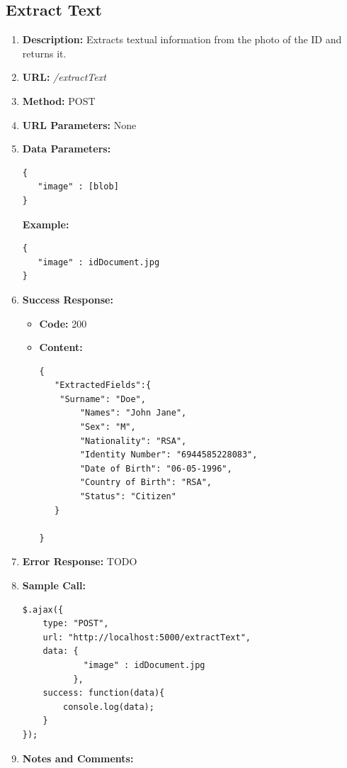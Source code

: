 \documentclass{article}
\begin{document}
\subsection{Extract Text}
\begin{enumerate}
	\item \textbf{Description:} Extracts textual information from the photo of the ID and returns it.
	\item \textbf{URL:} \textit{/extractText}
	\item \textbf{Method:} POST
	\item \textbf{URL Parameters:} None
	\item \textbf{Data Parameters:}

	\begin{lstlisting}
{
   "image" : [blob]
}
	\end{lstlisting}

	\textbf{Example:}

	\begin{lstlisting}
{
   "image" : idDocument.jpg
}
	\end{lstlisting}
	
	\item \textbf{Success Response:} 
		\begin{itemize}
			\item \textbf{Code:} 200
			\item \textbf{Content:}
			\begin{lstlisting}
{
   "ExtractedFields":{
   	"Surname": "Doe",
        "Names": "John Jane",
        "Sex": "M",
        "Nationality": "RSA",
        "Identity Number": "6944585228083",
        "Date of Birth": "06-05-1996",
        "Country of Birth": "RSA",
        "Status": "Citizen"
   }

}
			\end{lstlisting}
		\end{itemize}
		\item \textbf{Error Response:} TODO
		\item \textbf{Sample Call:}
		\begin{lstlisting}
$.ajax({
    type: "POST",
    url: "http://localhost:5000/extractText",
    data: {
            "image" : idDocument.jpg
          },
    success: function(data){
        console.log(data);
    }
});
		\end{lstlisting}
		\item \textbf{Notes and Comments:}
\end{enumerate}
\end{document}
